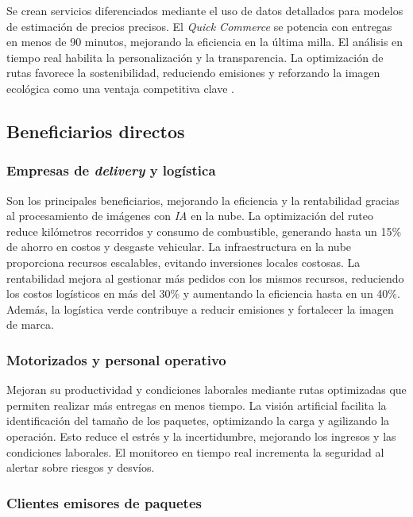 Se crean servicios diferenciados mediante el uso de datos detallados para modelos de estimación de precios precisos. El \textit{Quick Commerce} se potencia con entregas en menos de 90 minutos, mejorando la eficiencia en la última milla. El análisis en tiempo real habilita la personalización y la transparencia. La optimización de rutas favorece la sostenibilidad, reduciendo emisiones y reforzando la imagen ecológica como una ventaja competitiva clave \cite{WebRef132364}.


\subsection{Beneficiarios directos}

\subsubsection{Empresas de \textit{delivery} y logística}

Son los principales beneficiarios, mejorando la eficiencia y la rentabilidad gracias al procesamiento de imágenes con \textit{IA} en la nube. La optimización del ruteo reduce kilómetros recorridos y consumo de combustible, generando hasta un 15\% de ahorro en costos y desgaste vehicular. La infraestructura en la nube proporciona recursos escalables, evitando inversiones locales costosas. La rentabilidad mejora al gestionar más pedidos con los mismos recursos, reduciendo los costos logísticos en más del 30\% y aumentando la eficiencia hasta en un 40\%. Además, la logística verde contribuye a reducir emisiones y fortalecer la imagen de marca.

\subsubsection{Motorizados y personal operativo}

Mejoran su productividad y condiciones laborales mediante rutas optimizadas que permiten realizar más entregas en menos tiempo. La visión artificial facilita la identificación del tamaño de los paquetes, optimizando la carga y agilizando la operación. Esto reduce el estrés y la incertidumbre, mejorando los ingresos y las condiciones laborales. El monitoreo en tiempo real incrementa la seguridad al alertar sobre riesgos y desvíos.

\subsubsection{Clientes emisores de paquetes}

